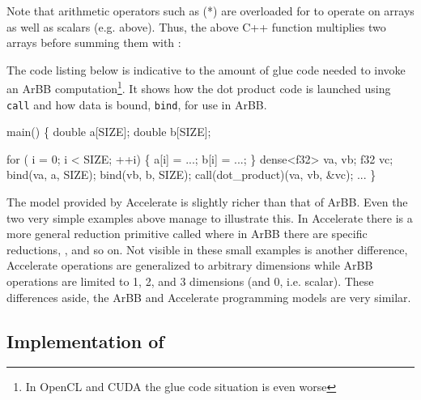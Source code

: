 Note that arithmetic operators such as (*) are overloaded 
for to operate on arrays as well as scalars (e.g.  above).
Thus, the above C++ function multiplies two arrays before summing them with :

The code listing below is indicative to the amount of glue code needed to invoke an 
ArBB computation\footnote{In OpenCL and CUDA the glue code situation is even worse}. It shows how the dot product code is launched using {\tt call} and 
how data is bound, {\tt bind}, for use in ArBB. 

\vspace{2mm}
\begin{code}
 main() 
\{ 
  double a[SIZE];
  double b[SIZE];

  for (  i = 0; i < SIZE; ++i) \{ 
    a[i] = ...; b[i] = ...;
  \}
  dense<f32> va, vb;
  f32 vc;
  bind(va, a, SIZE); 
  bind(vb, b, SIZE); 
  call(dot\_product)(va, vb, &vc); 
  ...
\}
\end{code}



The model provided by Accelerate is slightly richer than that of ArBB.
Even the two very simple  examples above manage to illustrate 
this. In Accelerate there is a more general reduction primitive called  
where in ArBB there are specific reductions, ,  
and so on. Not visible in these small examples is another difference, Accelerate 
operations are generalized to arbitrary dimensions while ArBB operations are 
limited to 1, 2, and 3 dimensions (and 0, i.e. scalar). These differences aside,
the ArBB and Accelerate programming models are very similar.


\subsection{Implementation of \systemname{}} 



